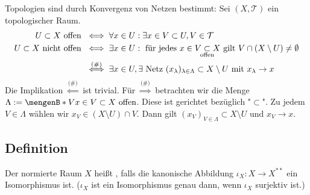 Topologien sind durch Konvergenz von Netzen bestimmt: Sei $(X,\mathcal{T})$ ein topologischer Raum. 
\begin{align*}
	U \subset X \text{ offen } &\iff \forall x \in U : \exists x \in V \subset U, V \in \mathcal{T} \\
	U \subset X \text{ nicht offen } &\iff \exists x \in U : \text{ für jedes } x \in V \underset{\mathclap{\text{offen}}}{\subset} X \text{ gilt } V \cap (X \setminus U) 
	\not= \emptyset \\
	&\stackrel{\text{(\#)}}{\iff} \exists x \in U, \exists \text{ Netz } (x_\lambda)_{\lambda \in \Lambda} \subset X \setminus U \text{ mit } x_\lambda \to x
\end{align*}
Die Implikation $\stackrel{\text{(\#)}}{\Longleftarrow}$ ist trivial. Für $\stackrel{\text{(\#)}}{\Longrightarrow}$ betrachten wir die Menge 
$\Lambda := \set[V]{x \in V \subset X \text{ offen}}$. Diese ist gerichtet bezüglich "$\subset$". Zu jedem $V \in \Lambda$ wählen wir 
$x_V \in (X \setminus U) \cap V$. Dann gilt $(x_V)_{V \in \Lambda} \subset X \setminus U$ und $x_V \to x$. \bewende

\subsection[Definition: Reflexiver normierter Raum]{Definition} %
\label{sub:513}
Der normierte Raum $X$ heißt , falls die kanonische Abbildung $\iota_X \colon X \to X^{**}$ ein Isomorphismus ist. 
($\iota_X$ ist ein Isomorphismus genau dann, wenn $\iota_X$ surjektiv ist.)

